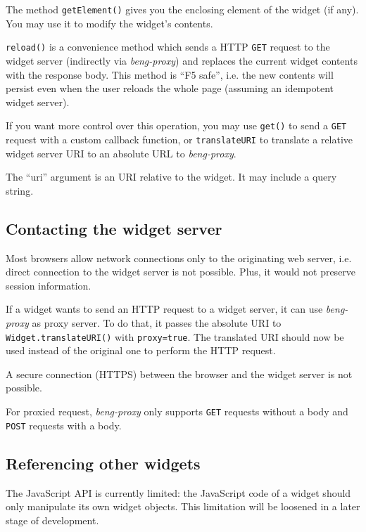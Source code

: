 \documentclass[a4paper,12pt]{article}
\begin{document}
The method \texttt{getElement()} gives you the enclosing element of
the widget (if any).  You may use it to modify the widget's contents.

\texttt{reload()} is a convenience method which sends a HTTP
\texttt{GET} request to the widget server (indirectly via
\emph{beng-proxy}) and replaces the current widget contents with the
response body.  This method is ``F5 safe'', i.e. the new contents will
persist even when the user reloads the whole page (assuming an
idempotent widget server).

If you want more control over this operation, you may use
\texttt{get()} to send a \texttt{GET} request with a custom callback
function, or \texttt{translateURI} to translate a relative widget
server URI to an absolute URL to \emph{beng-proxy}.

The ``uri'' argument is an URI relative to the widget.  It may include
a query string.


\subsection{Contacting the widget server}

Most browsers allow network connections only to the originating web
server, i.e. direct connection to the widget server is not possible.
Plus, it would not preserve session information.

If a widget wants to send an HTTP request to a widget server, it can
use \emph{beng-proxy} as proxy server.  To do that, it passes the
absolute URI to \texttt{Widget.translateURI()} with
\texttt{proxy=true}.  The translated URI should now be used instead of
the original one to perform the HTTP request.

A secure connection (HTTPS) between the browser and the widget server
is not possible.

For proxied request, \emph{beng-proxy} only supports \texttt{GET}
requests without a body and \texttt{POST} requests with a body.


\subsection{Referencing other widgets}

The JavaScript API is currently limited: the JavaScript code of a
widget should only manipulate its own widget objects.  This limitation
will be loosened in a later stage of development.
\end{document}
